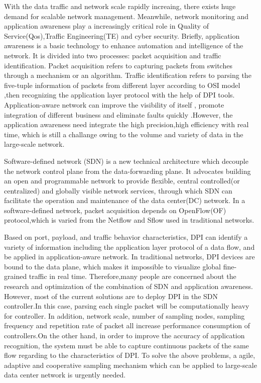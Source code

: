 \documentclass[conference,compsoc]{IEEEtran}
\begin{document}
With the data traffic and network scale rapidly increaing, there exists huge demand for scalable network management. Meanwhile, network monitoring and application awareness play a increasingly critical role in Quality of Service(Qos),Traffic Engineering(TE) and cyber security.
Briefly, application awareness is a basic technology to enhance  automation and intelligence of the network. It is divided into two processes: packet acquisition and traffic identification. Packet acquisition refers to capturing packets from switches through a mechanism or an algorithm. Traffic identification refers to parsing the five-tuple information of packets from different layer according to OSI model ,then  recognizing the application layer protocol with the help of DPI tools. Application-aware network can improve the visibility of itself , promote integration of different business and eliminate  faults quickly .However, the application awareness need integrate the high precision,high efficiency with real time, which is still a challange owing to the volume and variety of data in the large-scale network.

Software-defined network (SDN) is a new technical architecture which decouple the network control plane from the data-forwarding plane. It advocates building an open and programmable network to provide flexible, central controlled(or centralized) and globally visible network services, through which SDN can facilitate the operation and maintenance of the data center(DC) network. In a software-defined network, packet acquisition depends on OpenFlow(OF) protocol,which is varied from the Netflow and Sflow used in traditional networks.

Based on port, payload, and traffic behavior characteristics, DPI can identify a variety of  information including the application layer protocol of a data flow, and be applied in application-aware network. In traditional networks, DPI devices are bound to the data plane, which makes it impossible to visualize global fine-grained traffic in real time. Therefore,many people are concerned about the research and optimization of the combination of SDN and application awareness. However, most of the current solutions are to deploy DPI in the SDN controller.In this case, parsing each single packet will be  computationally heavy for controller. In addition, network scale, number of sampling nodes, sampling frequency and repetition rate of packet all increase performance consumption of controllers.On the other hand, in order to improve the accuracy of application recognition, the system must be able to capture continuous  packets of the same flow regarding to the characteristics of DPI.
To solve the above problems, a agile, adaptive and cooperative sampling mechanism which can be applied to large-scale data center network is urgently needed. 
\end{document}
